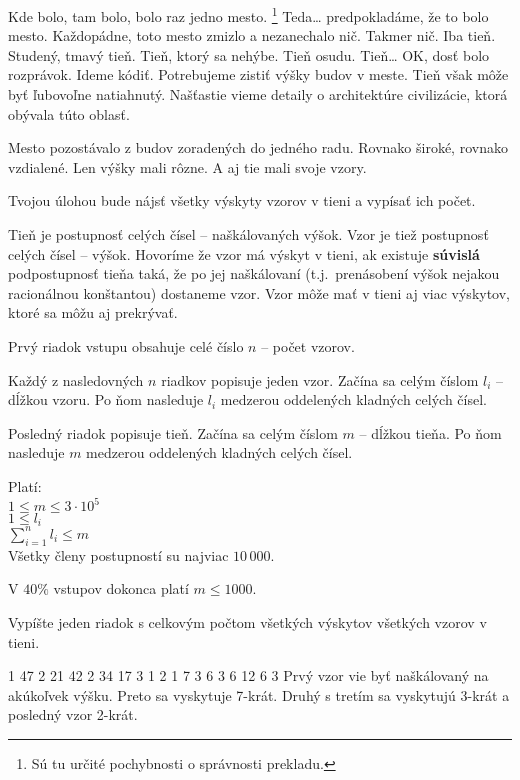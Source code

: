 





Kde bolo, tam bolo, bolo raz jedno mesto.
\footnote{Sú tu určité pochybnosti o správnosti prekladu.}
Teda\dots{} predpokladáme, že to bolo mesto.
Každopádne, toto mesto zmizlo a nezanechalo nič.
Takmer nič. Iba tieň. Studený, tmavý tieň.
Tieň, ktorý sa nehýbe. Tieň osudu.
Tieň\dots{} OK, dosť bolo rozprávok.
Ideme kódiť.
Potrebujeme zistiť výšky budov v meste.
Tieň však môže byť ľubovoľne natiahnutý.
Našťastie vieme detaily o architektúre civilizácie,
ktorá obývala túto oblasť.

Mesto pozostávalo z budov zoradených do jedného radu.
Rovnako široké, rovnako vzdialené. Len výšky mali rôzne.
A aj tie mali svoje vzory.

Tvojou úlohou bude nájsť všetky výskyty vzorov v tieni
a vypísať ich počet.



Tieň je postupnosť celých čísel -- naškálovaných výšok.
Vzor je tiež postupnosť celých čísel -- výšok.
Hovoríme že vzor má výskyt v tieni,
ak existuje \textbf{súvislá} podpostupnosť tieňa taká,
že po jej naškálovaní (t.j.\ prenásobení výšok nejakou racionálnou konštantou) dostaneme vzor.
Vzor môže mať v tieni aj viac výskytov, ktoré sa môžu aj prekrývať.



Prvý riadok vstupu obsahuje celé číslo $n$
-- počet vzorov.

Každý z nasledovných $n$ riadkov popisuje jeden vzor.
Začína sa celým číslom $l_i$ -- dĺžkou vzoru.
Po ňom nasleduje $l_i$ medzerou oddelených kladných celých čísel.

Posledný riadok popisuje tieň.
Začína sa celým číslom $m$ -- dĺžkou tieňa.
Po ňom nasleduje $m$ medzerou oddelených kladných celých čísel.

\bigskip

Platí:\\
$1 \leq m \leq 3\cdot10^5$\\
$1 \leq l_i$\\
$\sum^{n}_{i=1} l_i \leq m$\\
Všetky členy postupností su najviac $10\,000$.

\smallskip

V $40\%$ vstupov dokonca platí $m \leq 1000$.


Vypíšte jeden riadok s celkovým počtom všetkých výskytov
všetkých vzorov v tieni.



1 47
2 21 42
2 34 17
3 1 2 1
7 3 6 3 6 12 6 3
\sampleCOMMENT
Prvý vzor vie byť naškálovaný na akúkoľvek výšku.
Preto sa vyskytuje 7-krát. Druhý s tretím sa
vyskytujú 3-krát a posledný vzor 2-krát.
\sampleEND



